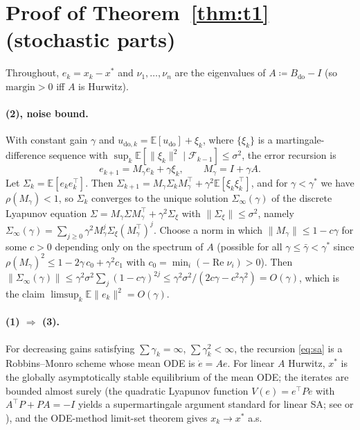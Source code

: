 \documentclass[pmlr]{jmlr}
\newcommand{\E}{\mathbb{E}}
\newcommand{\doop}{\mathrm{do}}
\newcommand{\margin}{\mathrm{margin}}
\newcommand{\gstar}{\gamma^{*}}
\begin{document}
\clearpage
\appendix

\section{Proof of Theorem~\ref{thm:t1} (stochastic parts)}\label{app:t1}

Throughout, $e_k = x_k - x^*$ and $\nu_1, \dots, \nu_n$ are the eigenvalues of
$A \coloneqq B_{\doop} - I$ (so $\margin > 0$ iff $A$ is Hurwitz).

\paragraph{(2), noise bound.} With constant gain $\gamma$ and
$u_{\doop,k} = \E[u_{\doop}] + \xi_k$, where $\{\xi_k\}$ is a martingale-difference sequence
with $\sup_k \E[\|\xi_k\|^2 \mid \mathcal{F}_{k-1}] \leq \sigma^2$, the error recursion is
\[
e_{k+1} = M_\gamma e_k + \gamma \xi_k, \qquad M_\gamma = I + \gamma A .
\]
Let $\Sigma_k = \E[e_k e_k^\top]$. Then
$\Sigma_{k+1} = M_\gamma \Sigma_k M_\gamma^\top + \gamma^2 \E[\xi_k \xi_k^\top]$, and for
$\gamma < \gstar$ we have $\rho(M_\gamma) < 1$, so $\Sigma_k$ converges to the unique solution
$\Sigma_\infty(\gamma)$ of the discrete Lyapunov equation
$\Sigma = M_\gamma \Sigma M_\gamma^\top + \gamma^2 \Sigma_\xi$ with
$\|\Sigma_\xi\| \le \sigma^2$, namely
$\Sigma_\infty(\gamma) = \sum_{j \geq 0} \gamma^2 M_\gamma^j \Sigma_\xi (M_\gamma^\top)^j$.
Choose a norm in which $\|M_\gamma\| \leq 1 - c\gamma$ for some $c > 0$ depending only on the
spectrum of $A$ (possible for all $\gamma \le \bar\gamma < \gstar$ since
$\rho(M_\gamma)^2 \le 1 - 2\gamma\,c_0 + \gamma^2 c_1$ with
$c_0 = \min_i(-\operatorname{Re}\nu_i) > 0$). Then
$\|\Sigma_\infty(\gamma)\| \leq \gamma^2 \sigma^2 \sum_j (1 - c\gamma)^{2j}
\leq \gamma^2 \sigma^2 / (2c\gamma - c^2\gamma^2) = O(\gamma)$,
which is the claim $\limsup_k \E\|e_k\|^2 = O(\gamma)$.

\paragraph{(1) $\Rightarrow$ (3).} For decreasing gains satisfying $\sum \gamma_k = \infty$,
$\sum \gamma_k^2 < \infty$, the recursion \eqref{eq:sa} is a Robbins--Monro scheme whose mean
ODE is $\dot{e} = A e$. For linear $A$ Hurwitz, $x^*$ is the globally asymptotically stable
equilibrium of the mean ODE; the iterates are bounded almost surely (the quadratic Lyapunov
function $V(e) = e^\top P e$ with $A^\top P + P A = -I$ yields a supermartingale argument
standard for linear SA; see \citealp[Ch.~5]{kushner2003stochastic} or
\citealp[Ch.~3]{borkar2008stochastic}), and the ODE-method limit-set theorem
\citep{ljung1977analysis,benaim1999dynamics,kushner2003stochastic} gives
$x_k \to x^*$ a.s.
\end{document}
